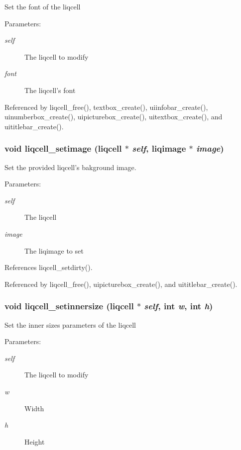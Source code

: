 Set the font of the liqcell \begin{Desc}
\item[Parameters:]
\begin{description}
\item[{\em self}]The liqcell to modify \item[{\em font}]The liqcell's font \end{description}
\end{Desc}


Referenced by liqcell\_\-free(), textbox\_\-create(), uiinfobar\_\-create(), uinumberbox\_\-create(), uipicturebox\_\-create(), uitextbox\_\-create(), and uititlebar\_\-create().
\subsubsection[{liqcell\_\-setimage}]{\setlength{\rightskip}{0pt plus 5cm}void liqcell\_\-setimage (liqcell $\ast$ {\em self}, \/  liqimage $\ast$ {\em image})}\label{d5/da2/liqcell_8c_972de10bca2d1bd4192f4225dd04fb2c}


Set the provided liqcell's bakground image. \begin{Desc}
\item[Parameters:]
\begin{description}
\item[{\em self}]The liqcell \item[{\em image}]The liqimage to set \end{description}
\end{Desc}


References liqcell\_\-setdirty().

Referenced by liqcell\_\-free(), uipicturebox\_\-create(), and uititlebar\_\-create().
\subsubsection[{liqcell\_\-setinnersize}]{\setlength{\rightskip}{0pt plus 5cm}void liqcell\_\-setinnersize (liqcell $\ast$ {\em self}, \/  int {\em w}, \/  int {\em h})}\label{d5/da2/liqcell_8c_52eafc75b1cd53384992a37258bd22b4}


Set the inner sizes parameters of the liqcell \begin{Desc}
\item[Parameters:]
\begin{description}
\item[{\em self}]The liqcell to modify \item[{\em w}]Width \item[{\em h}]Height \end{description}
\end{Desc}
